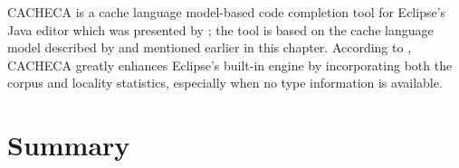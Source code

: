 CACHECA is a cache language model-based code completion tool for Eclipse's Java editor which was presented by \cite{Fran15a}; the tool is based on the cache language model described by \cite{Tu14a} and mentioned earlier in this chapter. According to \cite{Fran15a}, CACHECA greatly enhances Eclipse's built-in engine by incorporating both the corpus and locality statistics, especially when no type information is available.

\section{Summary}
\label{sec:RelatedWorks-Summary}